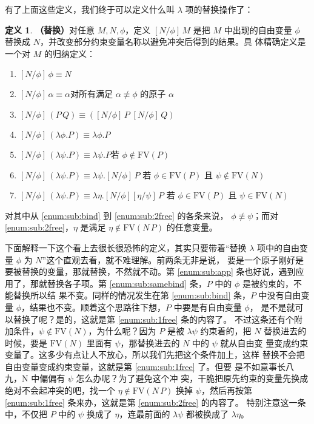 \documentclass[a4paper,adobefonts]{ctexart}
\newenvironment{tightenum}{
  \begin{enumerate}
    \setlength{\itemindent}{2\ccwd}
    \setlength{\itemsep}{0cm}
    \setlength{\parskip}{0cm}
}{
  \end{enumerate}
}
\theoremstyle{definition}
\newtheorem{definition}{定义}
\begin{document}
有了上面这些定义，我们终于可以定义什么叫 $\lambda$ 项的替换操作了：
\begin{definition}{\bfseries{（替换）}}\label{def:sub}
  对任意 $M,N,\phi$，定义 $[N/\phi]\,M$ 是把 $M$ 中出现的自由变量
  $\phi$ 替换成 $N$，并改变部分约束变量名称以避免冲突后得到的结果。具
  体精确定义是一个对 $M$ 的归纳定义：
  \begin{tightenum}
  \item $[N/\phi]\,\phi\equiv N$
  \item $[N/\phi]\,\alpha\equiv\alpha$\hfill 对所有满足
    $\alpha\not\equiv\phi$ 的原子 $\alpha$
  \item $[N/\phi]\,(P\,Q)\equiv([N/\phi]\,P\;[N/\phi]\,Q)$\label{enum:sub:app}
  \item $[N/\phi]\,(\lambda\phi.P)\equiv\lambda\phi.P$\label{enum:sub:samebind}
  \item $[N/\phi]\,(\lambda\psi.P)\equiv\lambda\psi.P$\hfill 若
    $\phi\not\in\text{FV}(P)$\label{enum:sub:bind}
  \item
    $[N/\phi]\,(\lambda\psi.P)\equiv\lambda\psi.[N/\phi]\,P$\hfill
    若 $\phi\in\text{FV}(P)$ 且 $\psi\not\in\text{FV}(N)$\label{enum:sub:1free}
  \item
    $[N/\phi]\,(\lambda\psi.P)\equiv\lambda\eta.[N/\phi][\eta/\psi]\,P$\hfill
    若 $\phi\in\text{FV}(P)$ 且 $\psi\in\text{FV}(N)$\label{enum:sub:2free}
  \end{tightenum}
  对其中从 \ref{enum:sub:bind} 到 \ref{enum:sub:2free} 的各条来说，
  $\phi\not\equiv\psi$；而对 \ref{enum:sub:2free}，$\eta$ 是满足
  $\eta\not\in\text{FV}(N\,P)$ 的任意变量。
\end{definition}

下面解释一下这个看上去很长很恐怖的定义，其实只要带着``替换 $\lambda$
项中的自由变量 $\phi$ 为 $N$''这个直观去看，就不难理解。前两条无非是说，
要是一个原子刚好是要被替换的变量，那就替换，不然就不动。第
\ref{enum:sub:app} 条也好说，遇到应用了，那就替换各子项。第
\ref{enum:sub:samebind} 条，$P$ 中的 $\phi$ 是被约束的，不能替换所以结
果不变。同样的情况发生在第 \ref{enum:sub:bind} 条，$P$ 中没有自由变量
$\phi$，结果也不变。顺着这个思路往下想，$P$ 中要是有自由变量 $\phi$，
是不是就可以替换了呢？是的，这就是第 \ref{enum:sub:1free} 条的内容了。
不过这条还有个附加条件，$\psi\not\in\text{FV}(N)$，为什么呢？因为 $P$
是被 $\lambda\psi$ 约束着的，把 $N$ 替换进去的时候，要是
$\text{FV}(N)$ 里面有 $\psi$，那替换进去的 $N$ 中的 $\psi$ 就从自由变
量变成约束变量了。这多少有点让人不放心，所以我们先把这个条件加上，这样
替换不会把自由变量变成约束变量，这就是第 \ref{enum:sub:1free} 了。但要
是不如意事长八九，$\text{N}$ 中偏偏有 $\psi$ 怎么办呢？为了避免这个冲
突，干脆把原先约束的变量先换成绝对不会起冲突的吧，找一个
$\eta\not\in\text{FV}(N\,P)$ 换掉 $\psi$，然后再按第
\ref{enum:sub:1free} 条来办，这就是第 \ref{enum:sub:2free} 的内容了。
特别注意这一条中，不仅把 $P$ 中的 $\psi$ 换成了 $\eta$，连最前面的
$\lambda\psi$ 都被换成了 $\lambda\eta$。
\end{document}
